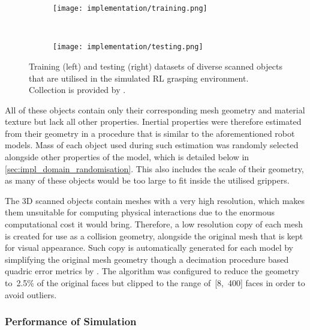 \begin{figure}[ht]
    \centering
    \begin{subfigure}[ht]{0.792\textwidth}
        \begin{flushleft}%
            \texttt{[image: implementation/training.png]}
        \end{flushleft}%
    \end{subfigure}%
    \vrule~%
    \begin{subfigure}[ht]{0.198\textwidth}
        \begin{flushright}%
            \texttt{[image: implementation/testing.png]}
        \end{flushright}%
    \end{subfigure}%
    \caption{Training (left) and testing (right) datasets of diverse scanned objects that are utilised in the simulated RL grasping environment. Collection is provided by \citet{googleresearch_google_2020}.}
    \label{fig:dataset}
\end{figure}

All of these objects contain only their corresponding mesh geometry and material texture but lack all other properties. Inertial properties were therefore estimated from their geometry in a procedure that is similar to the aforementioned robot models. Mass of each object used during such estimation was randomly selected alongside other properties of the model, which is detailed below in \autoref{sec:impl_domain_randomisation}. This also includes the scale of their geometry, as many of these objects would be too large to fit inside the utilised grippers.

The 3D scanned objects contain meshes with a very high resolution, which makes them unsuitable for computing physical interactions due to the enormous computational cost it would bring. Therefore, a low resolution copy of each mesh is created for use as a collision geometry, alongside the original mesh that is kept for visual appearance. Such copy is automatically generated for each model by simplifying the original mesh geometry though a decimation procedure based quadric error metrics by \citet{garland_surface_1997}. The algorithm was configured to reduce the geometry to~2.5\% of the original faces but clipped to the range of~[8,~400] faces in order to avoid outliers.


\subsubsection{Performance of Simulation}

